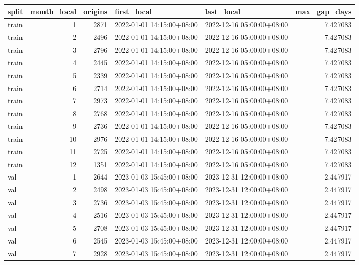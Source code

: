 \begin{tabular}{lrrllr}
\toprule
split & month\_local & origins & first\_local & last\_local & max\_gap\_days \\
\midrule
train & 1 & 2871 & 2022-01-01 14:15:00+08:00 & 2022-12-16 05:00:00+08:00 & 7.427083 \\
train & 2 & 2496 & 2022-01-01 14:15:00+08:00 & 2022-12-16 05:00:00+08:00 & 7.427083 \\
train & 3 & 2796 & 2022-01-01 14:15:00+08:00 & 2022-12-16 05:00:00+08:00 & 7.427083 \\
train & 4 & 2445 & 2022-01-01 14:15:00+08:00 & 2022-12-16 05:00:00+08:00 & 7.427083 \\
train & 5 & 2339 & 2022-01-01 14:15:00+08:00 & 2022-12-16 05:00:00+08:00 & 7.427083 \\
train & 6 & 2714 & 2022-01-01 14:15:00+08:00 & 2022-12-16 05:00:00+08:00 & 7.427083 \\
train & 7 & 2973 & 2022-01-01 14:15:00+08:00 & 2022-12-16 05:00:00+08:00 & 7.427083 \\
train & 8 & 2768 & 2022-01-01 14:15:00+08:00 & 2022-12-16 05:00:00+08:00 & 7.427083 \\
train & 9 & 2736 & 2022-01-01 14:15:00+08:00 & 2022-12-16 05:00:00+08:00 & 7.427083 \\
train & 10 & 2976 & 2022-01-01 14:15:00+08:00 & 2022-12-16 05:00:00+08:00 & 7.427083 \\
train & 11 & 2725 & 2022-01-01 14:15:00+08:00 & 2022-12-16 05:00:00+08:00 & 7.427083 \\
train & 12 & 1351 & 2022-01-01 14:15:00+08:00 & 2022-12-16 05:00:00+08:00 & 7.427083 \\
val & 1 & 2644 & 2023-01-03 15:45:00+08:00 & 2023-12-31 12:00:00+08:00 & 2.447917 \\
val & 2 & 2498 & 2023-01-03 15:45:00+08:00 & 2023-12-31 12:00:00+08:00 & 2.447917 \\
val & 3 & 2736 & 2023-01-03 15:45:00+08:00 & 2023-12-31 12:00:00+08:00 & 2.447917 \\
val & 4 & 2516 & 2023-01-03 15:45:00+08:00 & 2023-12-31 12:00:00+08:00 & 2.447917 \\
val & 5 & 2708 & 2023-01-03 15:45:00+08:00 & 2023-12-31 12:00:00+08:00 & 2.447917 \\
val & 6 & 2545 & 2023-01-03 15:45:00+08:00 & 2023-12-31 12:00:00+08:00 & 2.447917 \\
val & 7 & 2928 & 2023-01-03 15:45:00+08:00 & 2023-12-31 12:00:00+08:00 & 2.447917 \\

\end{tabular}
